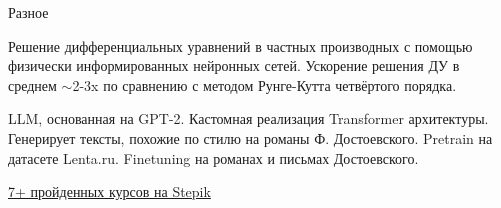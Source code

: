 \begin{rubric}{Разное}

\newline Решение дифференциальных уравнений в частных производных с помощью физически информированных нейронных сетей. Ускорение решения ДУ в среднем $\sim$2-3x по сравнению с методом Рунге-Кутта четвёртого порядка.

\newline LLM, основанная на GPT-2. Кастомная реализация Transformer архитектуры. Генерирует тексты, похожие по стилю на романы Ф. Достоевского. Pretrain на датасете Lenta.ru. Finetuning на романах и письмах Достоевского.

\entry*\href { https://stepik.org/users/516158220/certificates }{7+ пройденных курсов на Stepik}
\end{rubric}